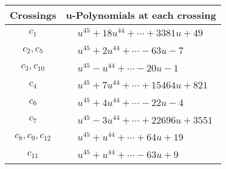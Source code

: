\documentclass[1p]{elsarticle_modified}
\theoremstyle{definition}
\begin{document}
\begin{tabular}{m{50pt}|m{274pt}}
Crossings & \hspace{64pt}u-Polynomials at each crossing \\
\hline $$\begin{aligned}c_{1}\end{aligned}$$&$\begin{aligned}
&u^{45}+18 u^{44}+\cdots+3381 u+49
\end{aligned}$\\
\hline $$\begin{aligned}c_{2},c_{5}\end{aligned}$$&$\begin{aligned}
&u^{45}+2 u^{44}+\cdots-63 u-7
\end{aligned}$\\
\hline $$\begin{aligned}c_{3},c_{10}\end{aligned}$$&$\begin{aligned}
&u^{45}- u^{44}+\cdots-20 u-1
\end{aligned}$\\
\hline $$\begin{aligned}c_{4}\end{aligned}$$&$\begin{aligned}
&u^{45}+7 u^{44}+\cdots+15464 u+821
\end{aligned}$\\
\hline $$\begin{aligned}c_{6}\end{aligned}$$&$\begin{aligned}
&u^{45}+4 u^{44}+\cdots-22 u-4
\end{aligned}$\\
\hline $$\begin{aligned}c_{7}\end{aligned}$$&$\begin{aligned}
&u^{45}-3 u^{44}+\cdots+22696 u+3551
\end{aligned}$\\
\hline $$\begin{aligned}c_{8},c_{9},c_{12}\end{aligned}$$&$\begin{aligned}
&u^{45}+u^{44}+\cdots+64 u+19
\end{aligned}$\\
\hline $$\begin{aligned}c_{11}\end{aligned}$$&$\begin{aligned}
&u^{45}+u^{44}+\cdots-63 u+9
\end{aligned}$\\
\hline
\end{tabular}\\~\\
\end{document}
